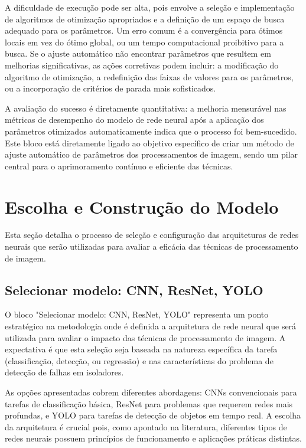 A dificuldade de execução pode ser alta, pois envolve a seleção e implementação de algoritmos de otimização apropriados e a definição de um espaço de busca adequado para os parâmetros. Um erro comum é a convergência para ótimos locais em vez do ótimo global, ou um tempo computacional proibitivo para a busca. Se o ajuste automático não encontrar parâmetros que resultem em melhorias significativas, as ações corretivas podem incluir: a modificação do algoritmo de otimização, a redefinição das faixas de valores para os parâmetros, ou a incorporação de critérios de parada mais sofisticados.

A avaliação do sucesso é diretamente quantitativa: a melhoria mensurável nas métricas de desempenho do modelo de rede neural após a aplicação dos parâmetros otimizados automaticamente indica que o processo foi bem-sucedido. Este bloco está diretamente ligado ao objetivo específico de criar um método de ajuste automático de parâmetros dos processamentos de imagem, sendo um pilar central para o aprimoramento contínuo e eficiente das técnicas.

\section{Escolha e Construção do Modelo}

Esta seção detalha o processo de seleção e configuração das arquiteturas de redes neurais que serão utilizadas para avaliar a eficácia das técnicas de processamento de imagem.

\subsection{Selecionar modelo: CNN, ResNet, YOLO}
O bloco "Selecionar modelo: CNN, ResNet, YOLO" representa um ponto estratégico na metodologia onde é definida a arquitetura de rede neural que será utilizada para avaliar o impacto das técnicas de processamento de imagem. A expectativa é que esta seleção seja baseada na natureza específica da tarefa (classificação, detecção, ou regressão) e nas características do problema de detecção de falhas em isoladores.

As opções apresentadas cobrem diferentes abordagens: CNNs convencionais para tarefas de classificação básica, ResNet para problemas que requerem redes mais profundas, e YOLO para tarefas de detecção de objetos em tempo real. A escolha da arquitetura é crucial pois, como apontado na literatura, diferentes tipos de redes neurais possuem princípios de funcionamento e aplicações práticas distintas.

